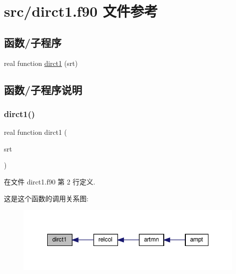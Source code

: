 \hypertarget{dirct1_8f90}{}\section{src/dirct1.f90 文件参考}
\label{dirct1_8f90}
\subsection*{函数/子程序}
\begin{DoxyCompactItemize}
\item 
real function \mbox{\hyperlink{dirct1_8f90_ac865bb23ad0512d8b73ded4fa028cb28}{dirct1}} (srt)
\end{DoxyCompactItemize}


\subsection{函数/子程序说明}
\mbox{\label{dirct1_8f90_ac865bb23ad0512d8b73ded4fa028cb28}} 
\subsubsection{\texorpdfstring{dirct1()}{dirct1()}}
{\footnotesize\ttfamily real function dirct1 (\begin{DoxyParamCaption}\item[{}]{srt }\end{DoxyParamCaption})}



在文件 dirct1.\+f90 第 2 行定义.

这是这个函数的调用关系图\+:
\nopagebreak
\begin{figure}[H]
\begin{center}
\leavevmode
\includegraphics[width=348pt]{dirct1_8f90_ac865bb23ad0512d8b73ded4fa028cb28_icgraph}
\end{center}
\end{figure}

